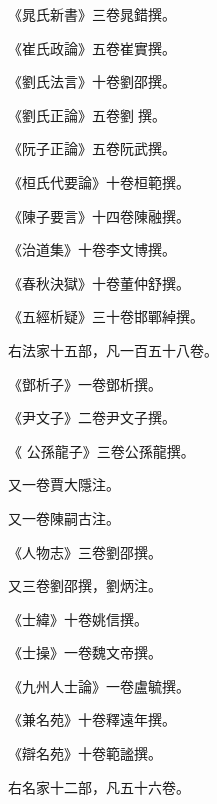 \begin{pinyinscope}
 《晁氏新書》三卷晁錯撰。



 《崔氏政論》五卷崔實撰。



 《劉氏法言》十卷劉邵撰。



 《劉氏正論》五卷劉撰。



 《阮子正論》五卷阮武撰。



 《桓氏代要論》十卷桓範撰。



 《陳子要言》十四卷陳融撰。



 《治道集》十卷李文博撰。



 《春秋決獄》十卷董仲舒撰。



 《五經析疑》三十卷邯鄲綽撰。



 右法家十五部，凡一百五十八卷。



 《鄧析子》一卷鄧析撰。



 《尹文子》二卷尹文子撰。



 《
 公孫龍子》三卷公孫龍撰。



 又一卷賈大隱注。



 又一卷陳嗣古注。



 《人物志》三卷劉邵撰。



 又三卷劉邵撰，劉炳注。



 《士緯》十卷姚信撰。



 《士操》一卷魏文帝撰。



 《九州人士論》一卷盧毓撰。



 《兼名苑》十卷釋遠年撰。



 《辯名苑》十卷範謐撰。



 右名家十二部，凡五十六卷。




\end{pinyinscope}
